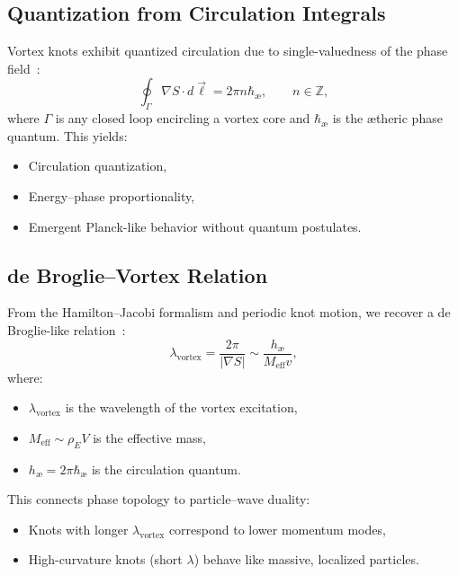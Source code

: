 \subsection*{Quantization from Circulation Integrals}

Vortex knots exhibit quantized circulation due to single-valuedness of the phase field~\cite{Helmholtz1858, faddeev1997stable}:
\begin{equation}
\oint_\Gamma \nabla S \cdot d\vec{\ell} = 2\pi n \hbar_\text{\ae}, \qquad n \in \mathbb{Z},
\end{equation}
where \( \Gamma \) is any closed loop encircling a vortex core and \( \hbar_\text{\ae} \) is the ætheric phase quantum. This yields:
\begin{itemize}
    \item Circulation quantization,
    \item Energy–phase proportionality,
    \item Emergent Planck-like behavior without quantum postulates.
\end{itemize}

\subsection*{de Broglie--Vortex Relation}

From the Hamilton–Jacobi formalism and periodic knot motion, we recover a de Broglie-like relation~\cite{ranada1990topological}:
\begin{equation}
\lambda_\text{vortex} = \frac{2\pi}{|\nabla S|} \sim \frac{h_\text{\ae}}{M_\text{eff} v},
\end{equation}
where:
\begin{itemize}
    \item \( \lambda_\text{vortex} \) is the wavelength of the vortex excitation,
    \item \( M_\text{eff} \sim \rho_{\scriptscriptstyle\boldsymbol\!E}V \) is the effective mass,
    \item \( h_\text{\ae} = 2\pi \hbar_\text{\ae} \) is the circulation quantum.
\end{itemize}

This connects phase topology to particle–wave duality:
\begin{itemize}
\item Knots with longer \( \lambda_\text{vortex} \) correspond to lower momentum modes,
\item High-curvature knots (short \( \lambda \)) behave like massive, localized particles.
\end{itemize}

